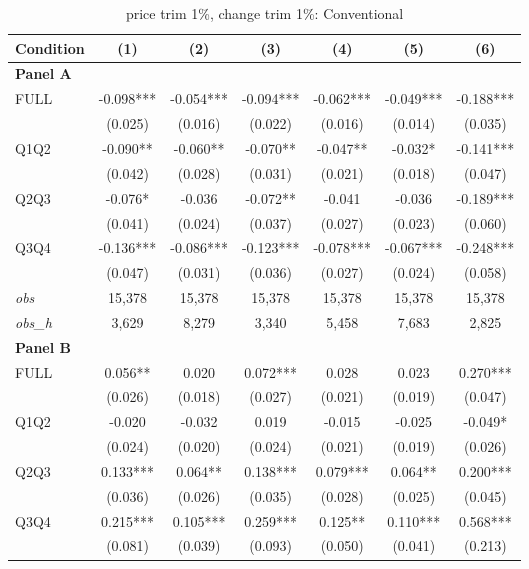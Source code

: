 \documentclass[10pt]{article}
\begin{document}
\begin{table}[!htbp]
\centering
\caption{price trim 1\%, change trim 1\%: Conventional}
\label{tab:abc:trim11:conventional}
\small
\begin{tabular}{lcccccc}
\toprule
Condition & (1) & (2) & (3) & (4) & (5) & (6) \\
\midrule
\textbf{Panel A} &&&&&&  \\

FULL & -0.098*** & -0.054*** & -0.094*** & -0.062*** & -0.049*** & -0.188*** \\
 & (0.025) & (0.016) & (0.022) & (0.016) & (0.014) & (0.035) \\
Q1Q2 & -0.090** & -0.060** & -0.070** & -0.047** & -0.032* & -0.141*** \\
 & (0.042) & (0.028) & (0.031) & (0.021) & (0.018) & (0.047) \\
Q2Q3 & -0.076* & -0.036 & -0.072** & -0.041 & -0.036 & -0.189*** \\
 & (0.041) & (0.024) & (0.037) & (0.027) & (0.023) & (0.060) \\
Q3Q4 & -0.136*** & -0.086*** & -0.123*** & -0.078*** & -0.067*** & -0.248*** \\
 & (0.047) & (0.031) & (0.036) & (0.027) & (0.024) & (0.058) \\

\textit{obs} & 15,378 & 15,378 & 15,378 & 15,378 & 15,378 & 15,378 \\
\textit{obs\_h} & 3,629 & 8,279 & 3,340 & 5,458 & 7,683 & 2,825 \\

\textbf{Panel B} &&&&&&  \\

FULL & 0.056** & 0.020 & 0.072*** & 0.028 & 0.023 & 0.270*** \\
 & (0.026) & (0.018) & (0.027) & (0.021) & (0.019) & (0.047) \\
Q1Q2 & -0.020 & -0.032 & 0.019 & -0.015 & -0.025 & -0.049* \\
 & (0.024) & (0.020) & (0.024) & (0.021) & (0.019) & (0.026) \\
Q2Q3 & 0.133*** & 0.064** & 0.138*** & 0.079*** & 0.064** & 0.200*** \\
 & (0.036) & (0.026) & (0.035) & (0.028) & (0.025) & (0.045) \\
Q3Q4 & 0.215*** & 0.105*** & 0.259*** & 0.125** & 0.110*** & 0.568*** \\
 & (0.081) & (0.039) & (0.093) & (0.050) & (0.041) & (0.213) \\


\end{tabular}
\end{table}
\end{document}
